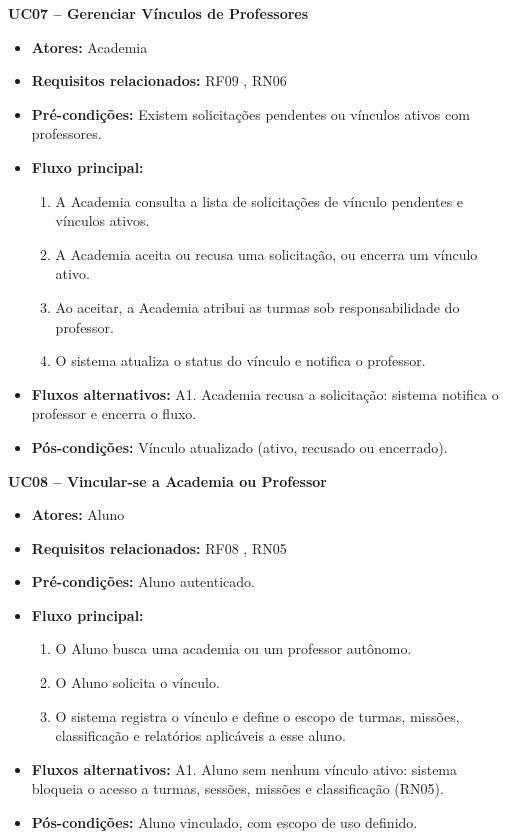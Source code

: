 \noindent\textbf{UC07 -- Gerenciar Vínculos de Professores}
\begin{itemize}[leftmargin=*, itemsep=0pt, topsep=2pt]
  \item \textbf{Atores:} Academia
  \item \textbf{Requisitos relacionados:} RF09 , RN06
  \item \textbf{Pré-condições:} Existem solicitações pendentes ou vínculos ativos com professores.
  \item \textbf{Fluxo principal:}
  \begin{enumerate}[label=\arabic*., itemsep=0pt, topsep=0pt]
    \item A Academia consulta a lista de solicitações de vínculo pendentes e vínculos ativos.
    \item A Academia aceita ou recusa uma solicitação, ou encerra um vínculo ativo.
    \item Ao aceitar, a Academia atribui as turmas sob responsabilidade do professor.
    \item O sistema atualiza o status do vínculo e notifica o professor.
  \end{enumerate}
  \item \textbf{Fluxos alternativos:} A1. Academia recusa a solicitação: sistema notifica o professor e encerra o fluxo.
  \item \textbf{Pós-condições:} Vínculo atualizado (ativo, recusado ou encerrado).
\end{itemize}
\medskip

\noindent\textbf{UC08 -- Vincular-se a Academia ou Professor}
\begin{itemize}[leftmargin=*, itemsep=0pt, topsep=2pt]
  \item \textbf{Atores:} Aluno
  \item \textbf{Requisitos relacionados:} RF08 , RN05
  \item \textbf{Pré-condições:} Aluno autenticado.
  \item \textbf{Fluxo principal:}
  \begin{enumerate}[label=\arabic*., itemsep=0pt, topsep=0pt]
    \item O Aluno busca uma academia ou um professor autônomo.
    \item O Aluno solicita o vínculo.
    \item O sistema registra o vínculo e define o escopo de turmas, missões, classificação e relatórios aplicáveis a esse aluno.
  \end{enumerate}
  \item \textbf{Fluxos alternativos:} A1. Aluno sem nenhum vínculo ativo: sistema bloqueia o acesso a turmas, sessões, missões e classificação (RN05).
  \item \textbf{Pós-condições:} Aluno vinculado, com escopo de uso definido.
\end{itemize}
\medskip

